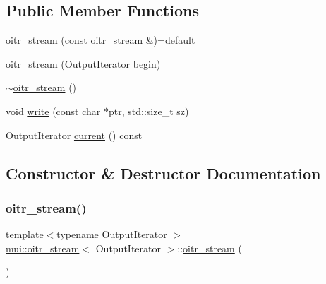 \subsection*{Public Member Functions}
\begin{DoxyCompactItemize}
\item 
\hyperlink{classmui_1_1oitr__stream_afde8e626cc976904af23c91fd74872cc}{oitr\+\_\+stream} (const \hyperlink{classmui_1_1oitr__stream}{oitr\+\_\+stream} \&)=default
\item 
\hyperlink{classmui_1_1oitr__stream_aadb5539d92ab1188615cda0d187feae9}{oitr\+\_\+stream} (Output\+Iterator begin)
\item 
\hyperlink{classmui_1_1oitr__stream_a5d50d06cd1c0a473c614eaa32648fba4}{$\sim$oitr\+\_\+stream} ()
\item 
void \hyperlink{classmui_1_1oitr__stream_aa726d0d57ba12ede019d019d382eb4cf}{write} (const char $\ast$ptr, std\+::size\+\_\+t sz)
\item 
Output\+Iterator \hyperlink{classmui_1_1oitr__stream_a8ee33091cd47f94182e3843a5d5d2649}{current} () const
\end{DoxyCompactItemize}


\subsection{Constructor \& Destructor Documentation}
\mbox{\label{classmui_1_1oitr__stream_afde8e626cc976904af23c91fd74872cc}} 
\subsubsection{\texorpdfstring{oitr\+\_\+stream()}{oitr\_stream()}\hspace{0.1cm}{\footnotesize\ttfamily [1/2]}}
{\footnotesize\ttfamily template$<$typename Output\+Iterator $>$ \\
\hyperlink{classmui_1_1oitr__stream}{mui\+::oitr\+\_\+stream}$<$ Output\+Iterator $>$\+::\hyperlink{classmui_1_1oitr__stream}{oitr\+\_\+stream} (\begin{DoxyParamCaption}\item[{const \hyperlink{classmui_1_1oitr__stream}{oitr\+\_\+stream}$<$ Output\+Iterator $>$ \&}]{ }\end{DoxyParamCaption})\hspace{0.3cm}{\ttfamily [default]}}

